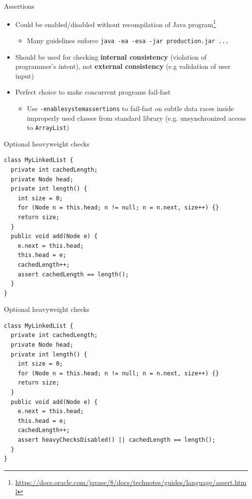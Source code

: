\begin{frame}[fragile,t]{Assertions}

\begin{itemize}
  \item Could be enabled/disabled without recompilation of Java program\footnote{\tiny\url{https://docs.oracle.com/javase/8/docs/technotes/guides/language/assert.html}}
  \begin{itemize}
    \item Many guidelines enforce \texttt{java -ea -esa -jar production.jar ...}
  \end{itemize}

  \item Should be used for checking \textbf{internal consistency} (violation of programmer's intent), not \textbf{external consistency} (e.g validation of user input)

  \item Perfect choice to make concurrent programs fail-fast
  \begin{itemize}
    \item Use \texttt{-enablesystemassertions} to fail-fast on subtle data races inside improperly used classes from standard library (e.g. unsynchronized access to \texttt{ArrayList})
  \end{itemize}
\end{itemize}
\end{frame}


\begin{frame}[fragile,t]{Optional heavyweight checks}

\begin{verbatim}
class MyLinkedList {
  private int cachedLength;
  private Node head;
  private int length() {
    int size = 0;
    for (Node n = this.head; n != null; n = n.next, size++) {}
    return size;
  }
  public void add(Node e) {
    e.next = this.head;
    this.head = e;
    cachedLength++;
    assert cachedLength == length();
  }
}
\end{verbatim}

\end{frame}

\begin{frame}{Optional heavyweight checks}

\begin{verbatim}
class MyLinkedList {
  private int cachedLength;
  private Node head;
  private int length() {
    int size = 0;
    for (Node n = this.head; n != null; n = n.next, size++) {}
    return size;
  }
  public void add(Node e) {
    e.next = this.head;
    this.head = e;
    cachedLength++;
    assert heavyChecksDisabled() || cachedLength == length();
  }
}
\end{verbatim}
\end{frame}


